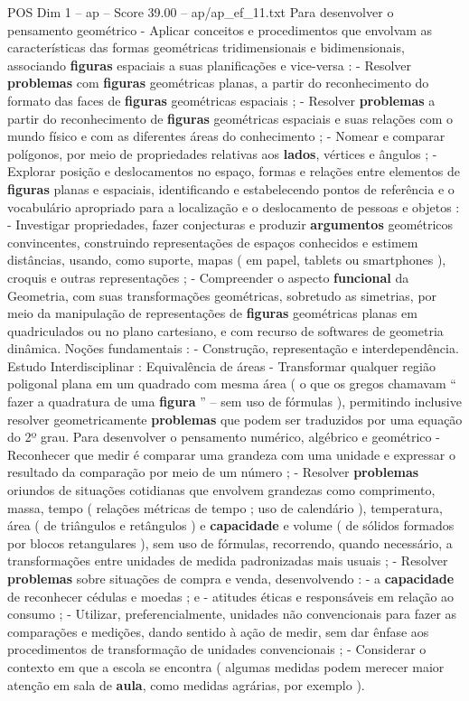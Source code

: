 \begin{textsample}{POS Dim 1 – ap – Score 39.00 – ap/ap\_ef\_11.txt}
Para desenvolver o pensamento geométrico - Aplicar conceitos e procedimentos que envolvam as características das formas geométricas tridimensionais e bidimensionais, associando \textbf{figuras} espaciais a suas planificações e vice-versa : - Resolver \textbf{problemas} com \textbf{figuras} geométricas planas, a partir do reconhecimento do formato das faces de \textbf{figuras} geométricas espaciais ; - Resolver \textbf{problemas} a partir do reconhecimento de \textbf{figuras} geométricas espaciais e suas relações com o mundo físico e com as diferentes áreas do conhecimento ; - Nomear e comparar polígonos, por meio de propriedades relativas aos \textbf{lados}, vértices e ângulos ; - Explorar posição e deslocamentos no espaço, formas e relações entre elementos de \textbf{figuras} planas e espaciais, identificando e estabelecendo pontos de referência e o vocabulário apropriado para a localização e o deslocamento de pessoas e objetos : - Investigar propriedades, fazer conjecturas e produzir \textbf{argumentos} geométricos convincentes, construindo representações de espaços conhecidos e estimem distâncias, usando, como suporte, mapas ( em papel, tablets ou smartphones ), croquis e outras representações ; - Compreender o aspecto \textbf{funcional} da Geometria, com suas transformações geométricas, sobretudo as simetrias, por meio da manipulação de representações de \textbf{figuras} geométricas planas em quadriculados ou no plano cartesiano, e com recurso de softwares de geometria dinâmica.
Noções fundamentais : - Construção, representação e interdependência.
Estudo Interdisciplinar : Equivalência de áreas - Transformar qualquer região poligonal plana em um quadrado com mesma área ( o que os gregos chamavam “ fazer a quadratura de uma \textbf{figura} ” – sem uso de fórmulas ), permitindo inclusive resolver geometricamente \textbf{problemas} que podem ser traduzidos por uma equação do 2º grau.
Para desenvolver o pensamento numérico, algébrico e geométrico - Reconhecer que medir é comparar uma grandeza com uma unidade e expressar o resultado da comparação por meio de um número ; - Resolver \textbf{problemas} oriundos de situações cotidianas que envolvem grandezas como comprimento, massa, tempo ( relações métricas de tempo ; uso de calendário ), temperatura, área ( de triângulos e retângulos ) e \textbf{capacidade} e volume ( de sólidos formados por blocos retangulares ), sem uso de fórmulas, recorrendo, quando necessário, a transformações entre unidades de medida padronizadas mais usuais ; - Resolver \textbf{problemas} sobre situações de compra e venda, desenvolvendo : - a \textbf{capacidade} de reconhecer cédulas e moedas ; e - atitudes éticas e responsáveis em relação ao consumo ; - Utilizar, preferencialmente, unidades não convencionais para fazer as comparações e medições, dando sentido à ação de medir, sem dar ênfase aos procedimentos de transformação de unidades convencionais ; - Considerar o contexto em que a escola se encontra ( algumas medidas podem merecer maior atenção em sala de \textbf{aula}, como medidas agrárias, por exemplo ).

\end{textsample}
